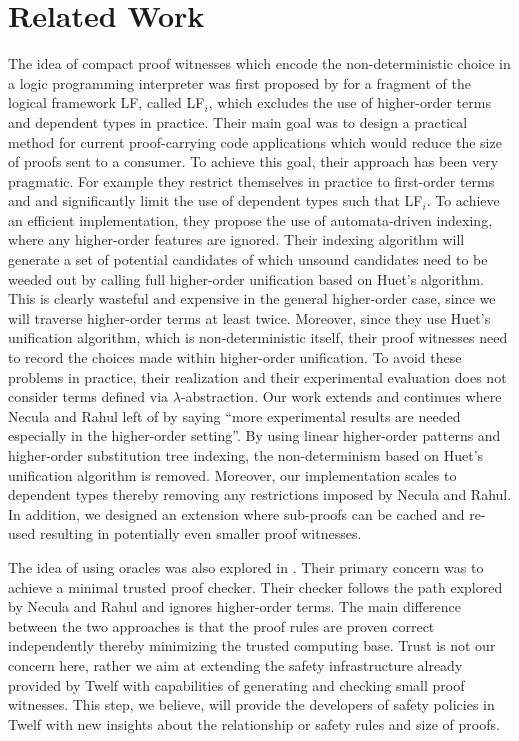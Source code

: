 \documentclass{llncs}
\newcommand{\ednote}[1]{\footnote{\it #1}}
\begin{document}
\section{Related Work}
The idea of compact proof witnesses which encode the
non-deterministic choice in a logic programming interpreter was first
proposed by \cite{Necula+01:oracle} for a fragment of the logical
framework LF, called LF$_i$, which excludes the use of higher-order
terms and dependent types in practice. 
Their main goal was to design a practical method for current
proof-carrying code applications which would reduce the size of proofs
sent to a consumer. To achieve this goal, their approach
has been very pragmatic. For example they restrict themselves in
practice to first-order terms and and significantly limit the use
of dependent types such that LF$_i$. To achieve an efficient
implementation, they propose the use of automata-driven indexing,
where any higher-order features are ignored. Their indexing algorithm
will generate a set of potential candidates of which unsound
candidates need to be weeded out by calling full 
higher-order unification based on Huet's algorithm. This is clearly
wasteful and expensive in the general higher-order case, since we will
traverse higher-order terms at least twice. Moreover, since they use
Huet's unification algorithm, which is non-deterministic itself, 
their proof witnesses need to record the choices made within
higher-order unification. To avoid these problems in practice, their
realization and their experimental evaluation does not consider terms
defined via $\lambda$-abstraction.  %
Our work extends and continues where Necula and Rahul left of by
saying ``more experimental results are needed especially in the
higher-order setting''. By using linear higher-order patterns and
higher-order substitution tree indexing, the non-determinism based on
Huet's unification algorithm is removed. Moreover, our implementation scales
to dependent types thereby removing any restrictions imposed by
Necula and Rahul. In addition, we designed an extension where
sub-proofs can be cached and re-used resulting in potentially even
smaller proof witnesses.

The idea of using oracles was also explored in
\cite{Appel:PPDP03}. Their primary concern was to 
achieve a minimal trusted proof checker. Their checker follows the
path explored by Necula and Rahul and ignores higher-order terms. The
main difference between the two approaches is that the proof rules are
proven correct independently thereby minimizing the trusted computing
base. Trust is not our concern here, rather we aim at extending the
safety infrastructure already provided by Twelf with capabilities of
generating and checking small proof witnesses. This step, we believe,
will provide the developers of safety policies in Twelf with new
insights about the relationship or safety rules and size of proofs.
\end{document}

